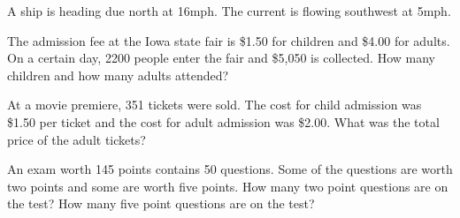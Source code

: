 \documentclass[../main.tex]{subfiles}
\begin{document}
\begin{questions}
        
    \question[1] A ship is heading due north at 16mph. The current is flowing southwest at 5mph. 
    
    \newpage
    \question[1] The admission fee at the Iowa state fair is \$1.50 for children and \$4.00 for adults. On a certain day, 2200 people enter the fair and \$5,050 is collected. How many children and how many adults attended? 
    
    \question[1] At a movie premiere, 351 tickets were sold. The cost for child admission was \$1.50 per ticket and the cost for adult admission was \$2.00. What was the total price of the adult tickets?  
    
    \question[1] An exam worth 145 points contains 50 questions. Some of the questions are worth two points and some are worth five points. How many two point questions are on the test? How many five point questions are on the test? 
    \end{questions}
\end{document}
